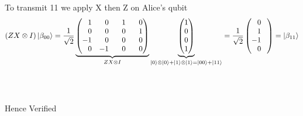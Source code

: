 \documentclass[a4paper,12pt]{article}
\begin{document}
\begin{enumerate}[label=(\alph*)]
    To transmit 11 we apply X then Z on Alice's qubit 
    \[(ZX \otimes I)\ket{\beta_{00}} = \frac{1}{\sqrt{2}} \underbrace{\begin{pmatrix}
        \phantom{-}1 & \phantom{-}0 & \phantom{-}1 & \phantom{-}0 \\
        \phantom{-}0 & \phantom{-}0 & \phantom{-}0 & \phantom{-}1 \\
        -1 & \phantom{-}0 & \phantom{-}0 & \phantom{-}0 \\
        \phantom{-}0 & -1 & \phantom{-}0 & \phantom{-}0 \\
    \end{pmatrix}}_{ZX \otimes I} \underbrace{\begin{pmatrix}
        1 \\
        0 \\
        0 \\
        1 \\
    \end{pmatrix}}_{\ket{0} \otimes \ket{0} + \ket{1} \otimes \ket{1} = \ket{00} +\ket{11}} = \frac{1}{\sqrt{2}}\begin{pmatrix}
        \phantom{-}0\phantom{-} \\
        \phantom{-}1\phantom{-} \\
        -1\phantom{-} \\
        \phantom{-}0\phantom{-} \\
    \end{pmatrix}  = \ket{\beta_{11}}\]\\~\\
    \begin{center}
        Hence Verified
    \end{center}


\end{enumerate}
\end{document}
